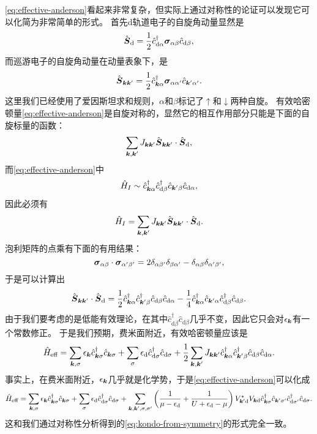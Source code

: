 \documentclass[hyperref, UTF8, a4paper]{ctexart}
\begin{document}
\eqref{eq:effective-anderson}看起来非常复杂，但实际上通过对称性的论证可以发现它可以化简为非常简单的形式。
首先d轨道电子的自旋角动量显然是
\[
    \hat{\vb*{S}}_\text{d} = \frac{1}{2} \hat{c}_{\text{d} \alpha}^\dagger \vb*{\sigma}_{\alpha \beta} \hat{c}_{\text{d} \beta},
\]
而巡游电子的自旋角动量在动量表象下，是
\[
    \hat{\vb*{S}}_{\vb*{k} \vb*{k}'} = \frac{1}{2} \hat{c}^\dagger_{\vb*{k} \alpha} \vb*{\sigma}_{\alpha \alpha'} \hat{c}_{\vb*{k}' \alpha'}.
\]
这里我们已经使用了爱因斯坦求和规则，$\alpha$和$\beta$标记了$\uparrow$和$\downarrow$两种自旋。
有效哈密顿量\eqref{eq:effective-anderson}是自旋对称的，显然它的相互作用部分只能是下面的自旋标量的函数：
\[
    \sum_{\vb*{k}, \vb*{k}'} J_{\vb*{k} \vb*{k}'} \hat{\vb*{S}}_{\vb*{k} \vb*{k}'} \cdot \hat{\vb*{S}}_\text{d},
\]
而\eqref{eq:effective-anderson}中
\[
    \hat{H}_I \sim \hat{c}^\dagger_{\vb*{k} \alpha} \hat{c}^\dagger_{\text{d} \beta} \hat{c}_{\vb*{k}' \beta} \hat{c}_{\text{d} \alpha},
\]
因此必须有
\[
    \hat{H}_I = \sum_{\vb*{k}, \vb*{k}'} J_{\vb*{k} \vb*{k}'} \hat{\vb*{S}}_{\vb*{k} \vb*{k}'} \cdot \hat{\vb*{S}}_\text{d}.
\]
泡利矩阵的点乘有下面的有用结果：
\[
    \vb*{\sigma}_{\alpha \beta} \cdot \vb*{\sigma}_{\alpha' \beta'} = 2 \delta_{\alpha \beta'} \delta_{\beta \alpha'} - \delta_{\alpha \beta} \delta_{\alpha' \beta'},
\]
于是可以计算出
\[
    \hat{\vb*{S}}_{\vb*{k} \vb*{k}'} \cdot \hat{\vb*{S}}_\text{d} = \frac{1}{2} \hat{c}^\dagger_{\vb*{k} \alpha} \hat{c}^\dagger_{\vb*{k}' \beta} \hat{c}_{\text{d} \beta} \hat{c}_{\text{d} \alpha} - \frac{1}{4} \hat{c}^\dagger_{\vb*{k} \alpha} \hat{c}_{\vb*{k}' \alpha} \hat{c}^\dagger_{\text{d} \beta} \hat{c}_{\text{d} \beta}.
\]
由于我们要考虑的是低能有效理论，在其中$\hat{c}^\dagger_{\text{d} \beta} \hat{c}_{\text{d} \beta}$几乎不变，因此它只会对$\epsilon_{\vb*{k}}$有一个常数修正。
于是我们预期，费米面附近，有效哈密顿量应该是
\begin{equation}
    \hat{H}_\text{eff} = \sum_{\vb*{k}, \sigma} \epsilon_{\vb*{k}} \hat{c}_{\vb*{k}\sigma}^\dagger \hat{c}_{\vb*{k} \sigma} + \sum_\sigma \epsilon_\text{d} \hat{c}_{\text{d}\sigma}^\dagger \hat{c}_{\text{d} \sigma} + \frac{1}{2} \sum_{\vb*{k}, \vb*{k}'} J_{\vb*{k} \vb*{k}'} \hat{c}^\dagger_{\vb*{k} \alpha} \hat{c}^\dagger_{\vb*{k}' \beta} \hat{c}_{\text{d} \beta} \hat{c}_{\text{d} \alpha}.
    \label{eq:kondo-from-symmetry}
\end{equation}
事实上，在费米面附近，$\epsilon_{\vb*{k}}$几乎就是化学势，于是\eqref{eq:effective-anderson}可以化成
\[
    \hat{H}_\text{eff} = \sum_{\vb*{k}, \sigma} \epsilon_{\vb*{k}} \hat{c}_{\vb*{k}\sigma}^\dagger \hat{c}_{\vb*{k} \sigma} + \sum_\sigma \epsilon_\text{d} \hat{c}_{\text{d}\sigma}^\dagger \hat{c}_{\text{d} \sigma} 
    + \sum_{\vb*{k}, \vb*{k}', \sigma, \sigma'} \left( \frac{1}{\mu - \epsilon_\text{d}} + \frac{1}{U + \epsilon_\text{d} - \mu} \right) V_{\vb*{k}' \text{d}}^* V_{\vb*{k} \text{d}} \hat{c}^\dagger_{\vb*{k} \sigma} \hat{c}_{\vb*{k}' \sigma'} \hat{c}^\dagger_{\text{d} \sigma'} \hat{c}_{\text{d} \sigma}.
\]
这和我们通过对称性分析得到的\eqref{eq:kondo-from-symmetry}的形式完全一致。
\end{document}
